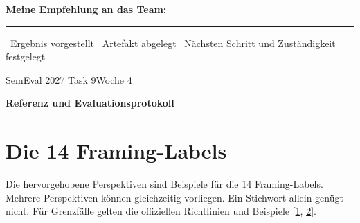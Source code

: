 \documentclass[10pt,a4paper]{article}
\renewcommand{\normalsize}{\fontsize{9.5}{12}\selectfont}
\newcommand{\checkbox}{\fbox{\rule{0pt}{2.4mm}\hspace{2.4mm}}}
\newcommand{\writingline}{\rule{\linewidth}{0.35pt}}
\newcommand{\followuptitle}[1]{%
  {\small SemEval 2027 Task 9\hfill Woche 4\par}%
  \vspace{6pt}%
  {\fontsize{16}{19}\selectfont\bfseries #1\par}%
  \vspace{8pt}%
}
\begin{document}
\textbf{Meine Empfehlung an das Team:}\par
\vspace{4mm}\writingline\par\vspace{2mm}

\small
\checkbox\ Ergebnis vorgestellt \hfill
\checkbox\ Artefakt abgelegt \hfill
\checkbox\ Nächsten Schritt und Zuständigkeit festgelegt

\newpage
\followuptitle{Referenz und Evaluationsprotokoll}
\normalsize
\renewcommand{\theHsection}{reference.\arabic{section}}
\setcounter{section}{0}
\section{Die 14 Framing-Labels}
Die hervorgehobene Perspektiven sind Beispiele für die 14 Framing-Labels.
Mehrere Perspektiven können gleichzeitig vorliegen. Ein Stichwort allein genügt nicht.
Für Grenzfälle gelten die offiziellen Richtlinien und Beispiele [\hyperlink{quelle-task}{1}, \hyperlink{quelle-card}{2}].
\end{document}
